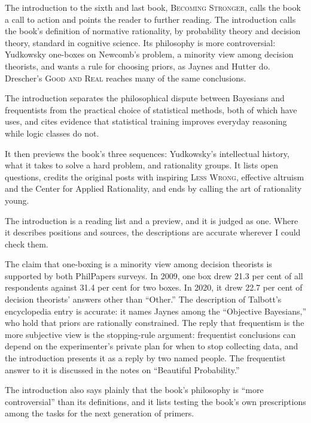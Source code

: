 \begin{afterword}
\summaryhead

The introduction to the sixth and last book, \textsc{Becoming Stronger}, calls the book a call to action and points the reader to further reading. The introduction calls the book's definition of normative rationality, by probability theory and decision theory, standard in cognitive science. Its philosophy is more controversial: Yudkowsky one-boxes on Newcomb's problem, a minority view among decision theorists, and wants a rule for choosing priors, as Jaynes and Hutter do. Drescher's \textsc{Good and Real} reaches many of the same conclusions.

The introduction separates the philosophical dispute between Bayesians and frequentists from the practical choice of statistical methods, both of which have uses, and cites evidence that statistical training improves everyday reasoning while logic classes do not.

It then previews the book's three sequences: Yudkowsky's intellectual history, what it takes to solve a hard problem, and rationality groups. It lists open questions, credits the original posts with inspiring \textsc{Less Wrong}, effective altruism and the Center for Applied Rationality, and ends by calling the art of rationality young.

\responsehead

The introduction is a reading list and a preview, and it is judged as one. Where it describes positions and sources, the descriptions are accurate wherever I could check them.

The claim that one-boxing is a minority view among decision theorists is supported by both PhilPapers surveys. In 2009, one box drew 21.3 per cent of all respondents against 31.4 per cent for two boxes. In 2020, it drew 22.7 per cent of decision theorists' answers other than ``Other.'' The description of Talbott's encyclopedia entry is accurate: it names Jaynes among the ``Objective Bayesians,'' who hold that priors are rationally constrained. The reply that frequentism is the more subjective view is the stopping-rule argument: frequentist conclusions can depend on the experimenter's private plan for when to stop collecting data, and the introduction presents it as a reply by two named people. The frequentist answer to it is discussed in the notes on ``Beautiful Probability.''

The introduction also says plainly that the book's philosophy is ``more controversial'' than its definitions, and it lists testing the book's own prescriptions among the tasks for the next generation of primers.


\end{afterword}
